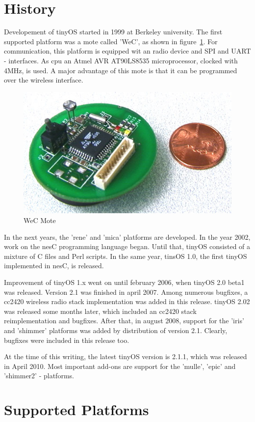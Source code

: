 \section{History}

Developement of tinyOS started in 1999 at Berkeley university. The first supported platform was a mote 
called 'WeC', as shown in figure~\ref{fig:WeC}. For communication, this platform is equipped wit an radio device and SPI and UART - interfaces. As cpu an Atmel AVR AT90LS8535 microprocessor, clocked with 4MHz, is used. A major advantage of this mote is that it can be programmed over the wireless interface.
\begin{figure}[h]
 \centerline{\includegraphics[width=.5\columnwidth]{pics/WeC.png}}
  \caption{WeC Mote}
  \label{fig:WeC}
\end{figure}

In the next years, the 'rene' and 'mica' platforms are developed. In the year 2002, work on the nesC programming language began. Until that, tinyOS consisted of a mixture of C files and Perl scripts. In the same year, tinsOS 1.0, the first tinyOS implemented in nesC, is released. 

Improvement of tinyOS 1.x went on until february 2006, when tinyOS 2.0 beta1 was released. Version 2.1 was finished in april 2007. Among numerous bugfixes, a cc2420 wireless radio stack implementation was added in this release. tinyOS 2.02 was released some months later, which included an cc2420 stack reimplementation and bugfixes.
After that, in august 2008, support for the 'iris' and 'shimmer' platforms was added by distribution of version 2.1. Clearly, bugfixes were included in this release too.

At the time of this writing, the latest tinyOS version is 2.1.1, which was released in April 2010. Most important add-ons are support for the 'mulle', 'epic' and 'shimmer2' - platforms. 

\section{Supported Platforms}

